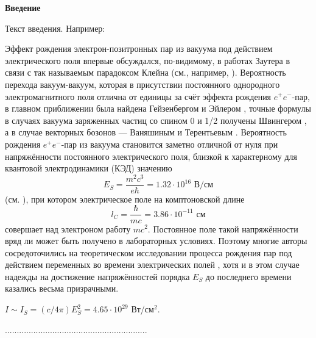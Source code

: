 \begin{center}
\LARGE\bf{Введение}
\end{center}

Текст введения. Например:

Эффект рождения электрон-позитронных пар из вакуума под действием
электрического поля впервые обсуждался, по-видимому, в работах
Заутера \cite{sauter} в связи с так называемым парадоксом Клейна
(см., например, \cite{zommerfeld}). Вероятность перехода
вакуум-вакуум, которая в присутствии постоянного однородного
электромагнитного поля отлична от единицы за счёт эффекта рождения
$e^+ e^-$-пар, в главном приближении была найдена Гейзенбергом и
Эйлером \cite{heisenberg}, точные формулы в случаях вакуума
заряженных частиц со спином 0 и 1/2 получены Швингером
\cite{schwinger}, а в случае векторных бозонов --- Ваняшиным и
Терентьевым \cite{vanyashin}. Вероятность рождения $e^+ e^-$-пар из
вакуума становится заметно отличной от нуля при напряжённости
постоянного электрического поля, близкой к характерному для
квантовой электродинамики (КЭД) значению
$$E_S=\frac{m^2c^3}{e\hbar}=1.32\cdot 10^{16}\,\,В/см $$                %
(см. \cite{sauter,zommerfeld,heisenberg,schwinger}), при котором
электрическое поле на комптоновской длине
 $$l_C =\frac{\hbar}{mc}=3.86\cdot 10^{-11}\,\,см$$
совершает над электроном работу $mc^2$. Постоянное поле такой
напряжённости вряд ли может быть получено в лабораторных условиях.
Поэтому многие авторы сосредоточились на теоретическом исследовании
процесса рождения пар под действием переменных во времени
электрических полей
\cite{bunkin,brezin,popov1,popov2,narozhny1,mostepanenko,marinov,grib,ringwald,popov3},
хотя и в этом случае надежды на достижение напряжённостей порядка
$E_S$ до последнего времени казались весьма призрачными.

\begin{center}
$I \sim I_S=(c/4\pi)E_S ^2=4.65\cdot 10^{29}$ Вт/см$^2$.                %
\end{center}

............................................................


